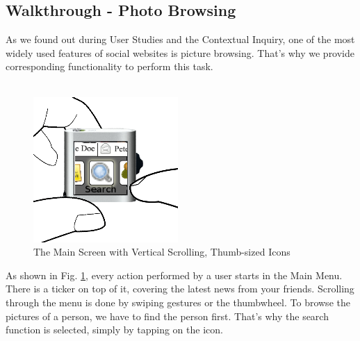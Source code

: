 %
%
% 

\subsection{Walkthrough - Photo Browsing}

As we found out during User Studies and the Contextual Inquiry, one of the most widely used features of social websites is picture browsing.
That's why we provide corresponding functionality to perform this task.
\\
\\
%
\begin{figure}[h]
  \begin{center}
    \includegraphics[width=0.6\linewidth]{imgs/wt1.png}
  \end{center}
  \caption{The Main Screen with Vertical Scrolling, Thumb-sized Icons}
  \label{fig:wt1}
\end{figure}
%
As shown in Fig. \ref{fig:wt1}, every action performed by a user starts in the Main Menu. There is a ticker on top of it, covering the latest news from your friends. Scrolling through the menu is done by swiping gestures or the thumbwheel.
To browse the pictures of a person, we have to find the person first. That's why the search function is selected, simply by tapping on the icon.
